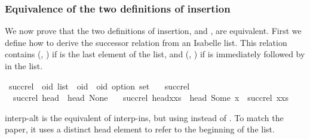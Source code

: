 \subsubsection{Equivalence of the two definitions of insertion}\label{sec:insert-alt-equiv}

We now prove that the two definitions of insertion,  and , are equivalent.
First we define how to derive the successor relation from an Isabelle list.
This relation contains (, ) if  is the last element of the list, and (, ) if  is immediately followed by  in the list.

\begin{isabelle}
\isamarkupfalse%
\ succ{\isacharunderscore}rel\ {\isacharcolon}{\isacharcolon}\ {\isachardoublequoteopen}{\isacharprime}oid\ list\ {\isasymRightarrow}\ {\isacharparenleft}{\isacharprime}oid\ {\isasymtimes}\ {\isacharprime}oid\ option{\isacharparenright}\ set{\isachardoublequoteclose}\ \isanewline
\ \ {\isachardoublequoteopen}succ{\isacharunderscore}rel\ {\isacharbrackleft}{\isacharbrackright}\ {\isacharequal}\ {\isacharbraceleft}{\isacharbraceright}{\isachardoublequoteclose}\ {\isacharbar}\isanewline
\ \ {\isachardoublequoteopen}succ{\isacharunderscore}rel\ {\isacharbrackleft}head{\isacharbrackright}\ {\isacharequal}\ {\isacharbraceleft}{\isacharparenleft}head{\isacharcomma}\ None{\isacharparenright}{\isacharbraceright}{\isachardoublequoteclose}\ {\isacharbar}\isanewline
\ \ {\isachardoublequoteopen}succ{\isacharunderscore}rel\ {\isacharparenleft}head{\isacharhash}x{\isacharhash}xs{\isacharparenright}\ {\isacharequal}\ {\isacharbraceleft}{\isacharparenleft}head{\isacharcomma}\ Some\ x{\isacharparenright}{\isacharbraceright}\ {\isasymunion}\ succ{\isacharunderscore}rel\ {\isacharparenleft}x{\isacharhash}xs{\isacharparenright}{\isachardoublequoteclose}%
\end{isabelle}

\noindent
interp-alt is the equivalent of interp-ins, but using  instead of .
To match the paper, it uses a distinct head element to refer to the beginning of the list.

